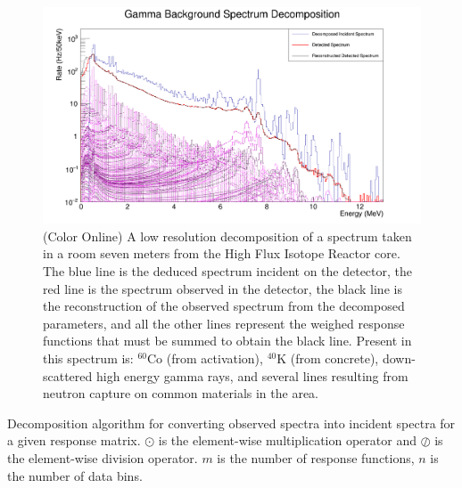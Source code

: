 \documentclass[5p]{elsarticle}
\makeatletter
\def\BState{\State\hskip-\ALG@thistlm}
\makeatother
\begin{document}
\begin{figure}[h]
\begin{center}
\includegraphics[width=\linewidth]{fit_plot}
\caption{(Color Online) A low resolution decomposition of a spectrum taken in a room seven meters from the High Flux Isotope Reactor core. The blue line is the deduced spectrum incident on the detector, the red line is the spectrum observed in the detector, the black line is the reconstruction of the observed spectrum from the decomposed parameters, and all the other lines represent the weighed response functions that must be summed to obtain the black line. Present in this spectrum is: $^{60}$Co (from activation), $^{40}$K (from concrete), down-scattered high energy gamma rays, and several lines resulting from neutron capture on common materials in the area.}
\label{fig-low-res-decomp}
\end{center}
\end{figure}

\begin{algorithm}[H]
\caption{Decomposition algorithm for converting observed spectra into incident spectra for a given response matrix. $\odot$ is the element-wise multiplication operator and $\oslash$ is the element-wise division operator. $m$ is the number of response functions, $n$ is the number of data bins.}\label{alg_decomp}
\end{algorithm}
\end{document}
